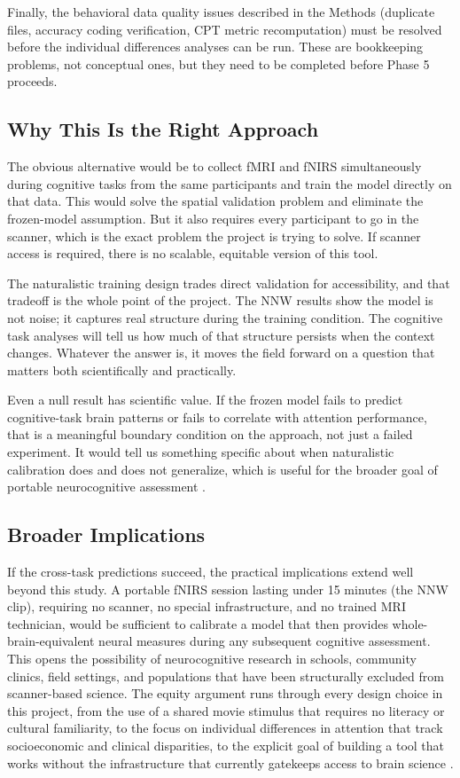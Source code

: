 Finally, the behavioral data quality issues described in the Methods (duplicate files, accuracy coding verification, CPT metric recomputation) must be resolved before the individual differences analyses can be run. These are bookkeeping problems, not conceptual ones, but they need to be completed before Phase 5 proceeds.

\subsection{Why This Is the Right Approach}

The obvious alternative would be to collect fMRI and fNIRS simultaneously during cognitive tasks from the same participants and train the model directly on that data. This would solve the spatial validation problem and eliminate the frozen-model assumption. But it also requires every participant to go in the scanner, which is the exact problem the project is trying to solve. If scanner access is required, there is no scalable, equitable version of this tool.

The naturalistic training design trades direct validation for accessibility, and that tradeoff is the whole point of the project. The NNW results show the model is not noise; it captures real structure during the training condition. The cognitive task analyses will tell us how much of that structure persists when the context changes. Whatever the answer is, it moves the field forward on a question that matters both scientifically and practically.

Even a null result has scientific value. If the frozen model fails to predict cognitive-task brain patterns or fails to correlate with attention performance, that is a meaningful boundary condition on the approach, not just a failed experiment. It would tell us something specific about when naturalistic calibration does and does not generalize, which is useful for the broader goal of portable neurocognitive assessment \citep{farah2006, noble2015}.

\subsection{Broader Implications}

If the cross-task predictions succeed, the practical implications extend well beyond this study. A portable fNIRS session lasting under 15 minutes (the NNW clip), requiring no scanner, no special infrastructure, and no trained MRI technician, would be sufficient to calibrate a model that then provides whole-brain-equivalent neural measures during any subsequent cognitive assessment. This opens the possibility of neurocognitive research in schools, community clinics, field settings, and populations that have been structurally excluded from scanner-based science. The equity argument runs through every design choice in this project, from the use of a shared movie stimulus that requires no literacy or cultural familiarity, to the focus on individual differences in attention that track socioeconomic and clinical disparities, to the explicit goal of building a tool that works without the infrastructure that currently gatekeeps access to brain science \citep{burns2019, farah2006}.
